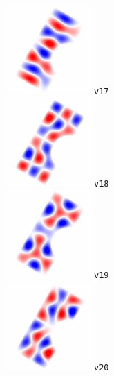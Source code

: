 \documentclass[a4paper,11pt]{article}
\begin{document}
\includegraphics[width=0.15\linewidth]{f/marimba_v17.png}\verb+v17+\\
\includegraphics[width=0.15\linewidth]{f/marimba_v18.png}\verb+v18+\\
\includegraphics[width=0.15\linewidth]{f/marimba_v19.png}\verb+v19+\\
\includegraphics[width=0.15\linewidth]{f/marimba_v20.png}\verb+v20+\\
\end{document}
